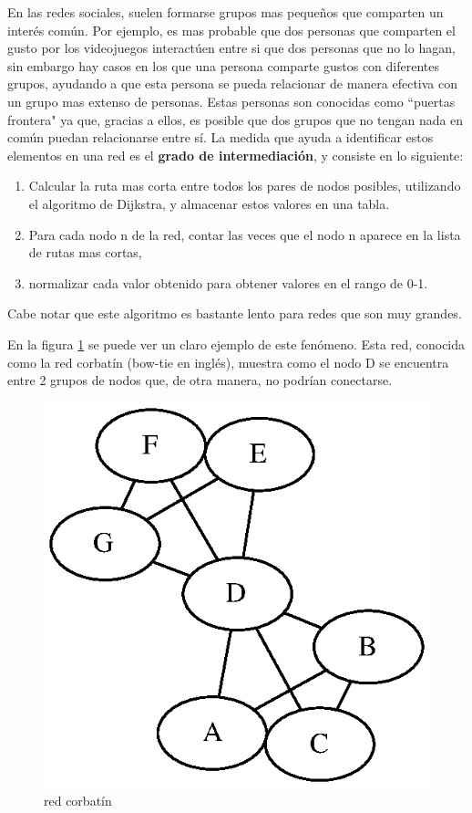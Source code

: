 En las redes sociales, suelen formarse grupos mas pequeños que comparten un interés común. Por ejemplo, es mas probable que dos personas que comparten el gusto por los videojuegos interactúen entre si que dos personas que no lo hagan, sin embargo hay casos en los que una persona comparte gustos con diferentes grupos, ayudando a que esta persona se pueda relacionar de manera efectiva con un grupo mas extenso de personas. Estas personas son conocidas como ``puertas frontera" ya que, gracias a ellos, es posible que dos grupos que no tengan nada en común puedan relacionarse entre sí. La medida que ayuda a identificar estos elementos en una red es el \textbf{grado de intermediación}, y consiste en lo siguiente:

\begin{enumerate}
  \item Calcular la ruta mas corta entre todos los pares de nodos posibles, utilizando el algoritmo de Dijkstra, y almacenar estos valores en una tabla.
  \item Para cada nodo n de la red, contar las veces que el nodo n aparece en la lista de rutas mas cortas,
  \item normalizar cada valor obtenido para obtener valores en el rango de 0-1.
\end{enumerate}

Cabe notar que este algoritmo es bastante lento para redes que son muy grandes.

En la figura \ref{fig:bow_tie} se puede ver un claro ejemplo de este fenómeno. Esta red, conocida como la red corbatín (bow-tie en inglés), muestra como el nodo D se encuentra entre 2 grupos de nodos que, de otra manera, no podrían conectarse.

\begin{figure}[!htb]
  \begin{center}
    \includegraphics{./imagenes/bow_tie.eps}
    \caption{red corbatín}
    \label{fig:bow_tie}
  \end{center}
\end{figure}

